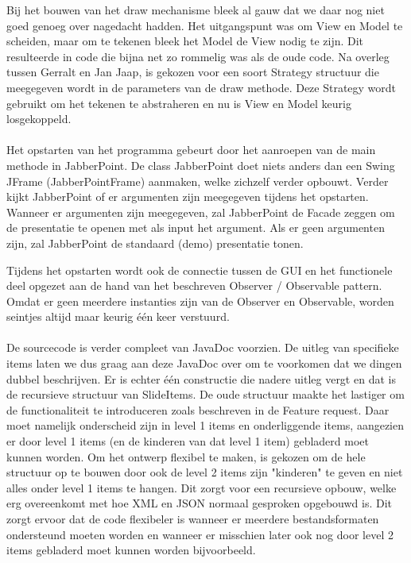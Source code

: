 \documentclass[a4paper]{article}
\newcommand{\1}[0]{\'{e}\'{e}n}
\begin{document}
Bij het bouwen van het draw mechanisme bleek al gauw dat we daar nog niet goed genoeg over nagedacht hadden. Het uitgangspunt was om View en Model te scheiden, maar om te tekenen bleek het Model de View nodig te zijn. Dit resulteerde in code die bijna net zo rommelig was als de oude code. Na overleg tussen Gerralt en Jan Jaap, is gekozen voor een soort Strategy structuur die meegegeven wordt in de parameters van de draw methode. Deze Strategy wordt gebruikt om het tekenen te abstraheren en nu is View en Model keurig losgekoppeld.
\\\\
Het opstarten van het programma gebeurt door het aanroepen van de main methode in JabberPoint. De class JabberPoint doet niets anders dan een Swing JFrame (JabberPointFrame) aanmaken, welke zichzelf verder opbouwt. Verder kijkt JabberPoint of er argumenten zijn meegegeven tijdens het opstarten. Wanneer er argumenten zijn meegegeven, zal JabberPoint de Facade zeggen om de presentatie te openen met als input het argument. Als er geen argumenten zijn, zal JabberPoint de standaard (demo) presentatie tonen. 

Tijdens het opstarten wordt ook de connectie tussen de GUI en het functionele deel opgezet aan de hand van het beschreven Observer / Observable pattern. Omdat er geen meerdere instanties zijn van de Observer en Observable, worden seintjes altijd maar keurig \1 keer verstuurd.
\\\\
De sourcecode is verder compleet van JavaDoc voorzien. De uitleg van specifieke items laten we dus graag aan deze JavaDoc over om te voorkomen dat we dingen dubbel beschrijven. Er is echter \1 constructie die nadere uitleg vergt en dat is de recursieve structuur van SlideItems. De oude structuur maakte het lastiger om de functionaliteit te introduceren zoals beschreven in de Feature request. Daar moet namelijk onderscheid zijn in level 1 items en onderliggende items, aangezien er door level 1 items (en de kinderen van dat level 1 item) gebladerd moet kunnen worden. Om het ontwerp flexibel te maken, is gekozen om de hele structuur op te bouwen door ook de level 2 items zijn "kinderen" te geven en niet alles onder level 1 items te hangen. Dit zorgt voor een recursieve opbouw, welke erg overeenkomt met hoe XML en JSON normaal gesproken opgebouwd is. Dit zorgt ervoor dat de code flexibeler is wanneer er meerdere bestandsformaten ondersteund moeten worden en wanneer er misschien later ook nog door level 2 items gebladerd moet kunnen worden bijvoorbeeld.
\end{document}

